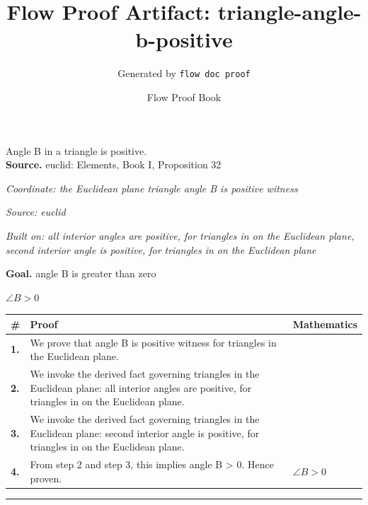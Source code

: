 \documentclass[11pt]{article}
\title{Flow Proof Artifact: triangle-angle-b-positive}
\author{Generated by \texttt{flow doc proof}}
\date{Flow Proof Book}
\theoremstyle{definition}
\begin{document}
\maketitle
Angle B in a triangle is positive.\\[0.5em]
\textbf{Source.} euclid: Elements, Book I, Proposition 32\\[0.5em]
\bigskip
{}\par
\smallskip\noindent\textit{Coordinate: the Euclidean plane \cdot triangle \cdot angle B is positive witness}\par
\smallskip\noindent\textit{Source: euclid}\par
\smallskip\noindent\textit{Built on: all interior angles are positive, for triangles in on the Euclidean plane, second interior angle is positive, for triangles in on the Euclidean plane}\par
\medskip
\noindent\textbf{Goal.} angle B is greater than zero\par
\noindent$\displaystyle \angle B > 0$\par
\medskip
\noindent
\begin{tabular}{@{} >{\raggedright\arraybackslash}p{} >{\raggedright\arraybackslash}p{} >{\raggedleft\arraybackslash}p{} @{}}
\textbf{\#} & \textbf{Proof} & \textbf{Mathematics} \\
\midrule
\textbf{1.} & We prove that angle B is positive witness for triangles in the Euclidean plane. & \\[0.45em]
\textbf{2.} & We invoke the derived fact governing triangles in the Euclidean plane: all interior angles are positive, for triangles in on the Euclidean plane. & \\[0.45em]
\textbf{3.} & We invoke the derived fact governing triangles in the Euclidean plane: second interior angle is positive, for triangles in on the Euclidean plane. & \\[0.45em]
\textbf{4.} & From step 2 and step 3, this implies angle B > 0. Hence proven. & $\displaystyle \angle B > 0$ \\[0.45em]
\bottomrule
\end{tabular}
\label{thm:Geometry-triangle-angle_b_is_positive_witness}
\par\medskip\hrule
\end{document}
